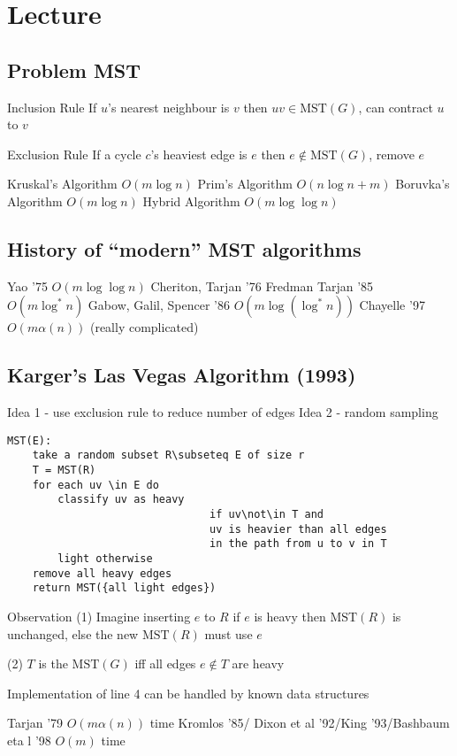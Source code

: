 \documentclass[english,12pt]{article}
\theoremstyle{plain}
\theoremstyle{definition}
\theoremstyle{definition} %
\begin{document}
\section{Lecture}
\subsection{Problem MST}
Inclusion Rule If $u$'s nearest neighbour is $v$ then $uv\in \text{MST}(G)$, can contract $u$ to $v$

Exclusion Rule If a cycle $c$'s heaviest edge is $e$ then $e\not\in\text{MST}(G)$, remove $e$

Kruskal's Algorithm $O(m\log n)$
Prim's Algorithm $O(n\log n + m)$
Boruvka's Algorithm $O(m\log n)$
Hybrid Algorithm $O(m\log\log n)$

\subsection{History of ``modern'' MST algorithms}
Yao '75 $O(m\log\log n)$
Cheriton, Tarjan '76
Fredman Tarjan '85 $O(m\log^\ast n)$
Gabow, Galil, Spencer '86 $O(m\log(\log^\ast n))$
Chayelle '97 $O(m\alpha(n))$ (really complicated)


\subsection{Karger's Las Vegas Algorithm (1993)}
Idea 1 - use exclusion rule to reduce number of edges
Idea 2 - random sampling
\begin{verbatim}
MST(E):
    take a random subset R\subseteq E of size r
    T = MST(R)
    for each uv \in E do
        classify uv as heavy 
                                if uv\not\in T and
                                uv is heavier than all edges
                                in the path from u to v in T
        light otherwise
    remove all heavy edges
    return MST({all light edges})
\end{verbatim}

Observation (1) Imagine inserting $e$ to $R$
if $e$ is heavy then $\text{MST}(R)$ is unchanged, else the new $\text{MST}(R)$ must use $e$

(2) $T$ is the $\text{MST}(G)$ iff all edges $e\not\in T$ are heavy

Implementation of line 4 can be handled by known data structures

Tarjan '79 $O(m\alpha(n))$ time
Kromlos '85/ Dixon et al '92/King '93/Bashbaum eta l '98 $O(m)$ time
\end{document}
